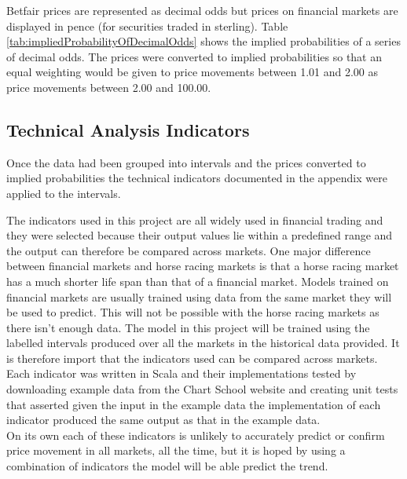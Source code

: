 			Betfair prices are represented as decimal odds but prices on financial markets are displayed in pence (for securities traded in sterling). Table \ref{tab:impliedProbabilityOfDecimalOdds} shows the implied probabilities of a series of decimal odds. The prices were converted to implied probabilities so that an equal weighting would be given to price movements between 1.01 and 2.00 as price movements between 2.00 and 100.00.
							
		\subsection{Technical Analysis Indicators}
			Once the data had been grouped into intervals and the prices converted to implied probabilities the technical indicators documented in the appendix were applied to the intervals.\\
			
						
			The indicators used in this project are all widely used in financial trading and they were selected because their output values lie within a predefined range and the output can therefore be compared across markets. One major difference between financial markets and horse racing markets is that a horse racing market has a much shorter life span than that of a financial market. Models trained on financial markets are usually trained using data from the same market they will be used to predict. This will not be possible with the horse racing markets as there isn't enough data. The model in this project will be trained using the labelled intervals produced over all the markets in the historical data provided. It is therefore import that the indicators used can be compared across markets.\\
			
			Each indicator was written in Scala and their implementations tested by downloading example data from the Chart School website\cite{technicalIndicators} and creating unit tests that asserted given the input in the example data the implementation of each indicator produced the same output as that in the example data.\\ 
			  
			On its own each of these indicators is unlikely to accurately predict or confirm price movement in all markets, all the time, but it is hoped by using a combination of indicators the model will be able predict the trend.		
		
